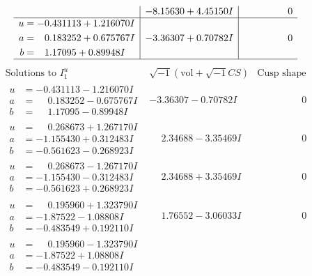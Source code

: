 \documentclass[1p]{elsarticle_modified}
\theoremstyle{definition}
\newcommand{\I}{\sqrt{-1}}
\begin{document}
$$\begin{array}{c|c|c}
 & -8.15630 + 4.45150 I & \phantom{-0.000000 } 0 \\ \hline\begin{aligned}
u &= -0.431113 + 1.216070 I \\
a &= \phantom{-}0.183252 + 0.675767 I \\
b &= \phantom{-}1.17095 + 0.89948 I\end{aligned}
 & -3.36307 + 0.70782 I & \phantom{-0.000000 } 0\\
 \hline 
 \end{array}$$\newpage$$\begin{array}{c|c|c}  
\text{Solutions to }I^u_{1}& \I (\text{vol} + \sqrt{-1}CS) & \text{Cusp shape}\\
 \hline 
\begin{aligned}
u &= -0.431113 - 1.216070 I \\
a &= \phantom{-}0.183252 - 0.675767 I \\
b &= \phantom{-}1.17095 - 0.89948 I\end{aligned}
 & -3.36307 - 0.70782 I & \phantom{-0.000000 } 0 \\ \hline\begin{aligned}
u &= \phantom{-}0.268673 + 1.267170 I \\
a &= -1.155430 + 0.312483 I \\
b &= -0.561623 - 0.268923 I\end{aligned}
 & \phantom{-}2.34688 - 3.35469 I & \phantom{-0.000000 } 0 \\ \hline\begin{aligned}
u &= \phantom{-}0.268673 - 1.267170 I \\
a &= -1.155430 - 0.312483 I \\
b &= -0.561623 + 0.268923 I\end{aligned}
 & \phantom{-}2.34688 + 3.35469 I & \phantom{-0.000000 } 0 \\ \hline\begin{aligned}
u &= \phantom{-}0.195960 + 1.323790 I \\
a &= -1.87522 - 1.08808 I \\
b &= -0.483549 + 0.192110 I\end{aligned}
 & \phantom{-}1.76552 - 3.06033 I & \phantom{-0.000000 } 0 \\ \hline\begin{aligned}
u &= \phantom{-}0.195960 - 1.323790 I \\
a &= -1.87522 + 1.08808 I \\
b &= -0.483549 - 0.192110 I\end{aligned}

\end{array}$$
\end{document}
